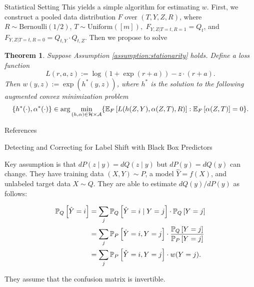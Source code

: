 \documentclass{article}
\theoremstyle{definition}
\theoremstyle{plain}
\newtheorem{theo}[prop]{Theorem}
\theoremstyle{remark}
\begin{document}
\begin{section}{Statistical Setting}
This yields a simple algorithm for estimating $w$. First, we construct a pooled data distribution $F$ over $(T, Y, Z, R)$, where $R \sim \text{Bernoulli}(1/2)$, $T \sim \text{Uniform}([m]),$ $F_{Y, Z |T =t,R=1} = Q_{t}$, and $F_{Y, Z |T =t,R=0} = Q_{t, Y} \cdot Q_{t, Z}$. Then we propose to solve

\begin{theo}
Suppose Assumption \ref{assumption:stationarity} holds. Define a loss function 
\[ L(r, a, z) := \log(1 + \exp(r + a)) - z \cdot (r + a).\]
Then $w(y, z) := \exp(h^{*}(y, z))$, where $h^{*}$ is the solution to the following augmented convex minimization problem 
\[ \{h^{*}(\cdot), \alpha^{*}(\cdot)\} \in \arg \min_{(h, \alpha) \in \mathcal{H} \times \mathcal{A}} \{ \EE[F]{L(h(Z, Y), \alpha(Z, T), R)} : \EE[F]{\alpha(Z, T)} = 0 \}.\]
\end{theo}




\end{section}

\begin{section}{References}

\begin{subsection}{Detecting and Correcting for Label Shift with Black Box Predictors}
\cite{lipton2018detecting}

Key assumption is that $dP(z \mid y) = dQ(z \mid y)$ but $dP(y) = dQ(y)$ can change. They have training data $(X, Y) \sim P$, a model $\hat{Y} = f(X)$, and unlabeled target data $X \sim Q$. They are able to estimate $dQ(y) / dP(y)$ as follows:

\begin{align*}
\PP[Q]{\hat{Y} = i} &= \sum_{j} \PP[Q]{\hat{Y} = i \mid Y = j } \cdot \PP[Q]{Y = j} \\ 
&= \sum_{j} \PP[P]{\hat{Y} = i, Y= j} \cdot \frac{\PP[Q]{Y = j}}{\PP[P]{Y = j}} \\
&= \sum_{j} \PP[P]{\hat{Y} = i, Y = j} \cdot w(Y = j).
\end{align*}

They assume that the confusion matrix is invertible.

\end{subsection}


\end{section}

 

\end{document}
